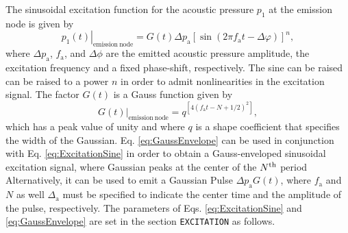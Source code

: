 The sinusoidal excitation function for the acoustic pressure $p_1$ at the emission node is given by
\begin{equation}
\left.p_1\left(t\right)\right|_{\mathrm{emission\:node}} = G\left(t\right)\Delta p_{\mathrm{a}}\left[\sin\left(2\pi f_{\mathrm{a}}t - \Delta \varphi\right)\right]^n,
\label{eq:ExcitationSine}
\end{equation}
where $\Delta p_{\mathrm{a}}$, $f_{\mathrm{a}}$, and $\Delta \phi$ are the emitted acoustic pressure amplitude, the excitation frequency and a fixed phase-shift, respectively. The sine can be raised can be raised to a power $n$ in order to admit nonlinearities in the excitation signal. The factor $G\left(t\right)$ is a Gauss function given by
\begin{equation}
\left.G\left(t\right)\right|_{\mathrm{emission\:node}} = q^{\displaystyle\left[ 4\left(f_{\mathrm{a}}t - N + 1/2\right)^2\right]},
\label{eq:GaussEnvelope}
\end{equation}
which has a peak value of unity and where $q$ is a shape coefficient that specifies the width of the Gaussian. Eq. \eqref{eq:GaussEnvelope} can be used in conjunction with Eq. \eqref{eq:ExcitationSine} in order to obtain a Gauss-enveloped sinusoidal excitation signal, where Gaussian peaks at the center of the $N^{\textnormal{th}}$ period Alternatively, it can be used to emit a Gaussian Pulse $\Delta p_{\mathrm{a}}G\left(t\right)$, where $f_{\mathrm{a}}$ and $N$ as well $\Delta _{\mathrm{a}}$ must be specified to indicate the center time and the amplitude of the pulse, respectively. The parameters of Eqs. \eqref{eq:ExcitationSine} and \eqref{eq:GaussEnvelope} are set in the section {\tt EXCITATION} as follows.

